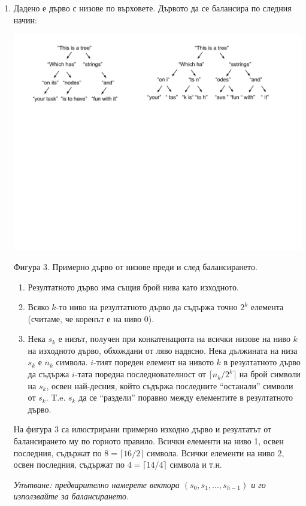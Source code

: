 \documentclass[12pt,a4paper]{article}
\begin{document}
\begin{enumerate}
	\item Дадено е дърво с низове по върховете. Дървото да се балансира по следния начин:

	\begin{flushleft}
	\includegraphics[width=15cm]{images/tree4}

	\vspace{-200px}

	Фигура 3. Примерно дърво от низове преди и след балансирането.
	\end{flushleft}


	\begin{enumerate}
	  \item Резултатното дърво има същия брой нива като изходното.
		\item Всяко $k$-то ниво на резултатното дърво да съдържа точно $2^k$ елемента (считаме, че коренът е на ниво 0).
		\item Нека $s_k$ е низът, получен при конкатенацията на всички низове на ниво $k$ на изходното дърво, обхождани от ляво надясно. Нека дължината на низа $s_k$ е $n_k$ символа. $i$-тият пореден елемент на нивото $k$ в резултатното дърво да съдържа $i$-тата поредна последнователност от $\lceil{n_k/{2^k}}\rceil$ на брой символи на $s_k$, освен най-десния, който съдържа последните ``останали'' символи от $s_k$. T.e. $s_k$ да се ``раздели'' поравно между елементите в резултатното дърво.
	\end{enumerate}

	На фигура 3 са илюстрирани примерно изходно дърво и резултатът от балансирането му по горното правило. Всички елементи на ниво 1, освен последния, съдържат по $8=\lceil{16/2}\rceil$ символа. Всички елементи на ниво 2, освен последния, съдържат по $4=\lceil{14/4}\rceil$ символа и т.н.


	\emph{Упътване: предварително намерете вектора $(s_0,s_1,...,s_{h-1})$ и го използвайте за балансирането.}

\end{enumerate}
\end{document}

